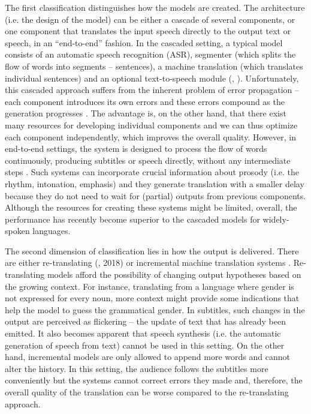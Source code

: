 \documentclass[output=paper]{langscibook}
\begin{document}
The first classification distinguishes how the models are created. The architecture (i.e. the design of the model) can be either a cascade of several components, or one component that translates the input speech directly to the output text or speech, in an “end-to-end” fashion. In the cascaded setting, a typical model consists of an automatic speech recognition (ASR), segmenter (which splits the flow of words into segments – sentences), a machine translation (which translates individual sentences) and an optional text-to-speech module (\citealt{MüllerEtAl2016}, \citealt{bojar_elitr_2021}). Unfortunately, this cascaded approach suffers from the inherent problem of error propagation – each component introduces its own errors and these errors compound as the generation progresses \citep{RuizEtAl2014}. The advantage is, on the other hand, that there exist many resources for developing individual components and we can thus optimize each component independently, which improves the overall quality. However, in end-to-end settings, the system is designed to process the flow of words continuously, producing subtitles or speech directly, without any intermediate steps \citep{PolákEtAl2022}. Such systems can incorporate crucial information about prosody (i.e. the rhythm, intonation, emphasis) and they generate translation with a smaller delay because they do not need to wait for (partial) outputs from previous components. Although the resources for creating these systems might be limited, overall, the performance has recently become superior to the cascaded models for widely-spoken languages.

The second dimension of classification lies in how the output is delivered. There are either re-translating (\citealt{NiehuesEtAl2016}, 2018) or incremental machine translation systems \citep{DalviEtAl2018}. Re-translating models afford the possibility of changing output hypotheses based on the growing context. For instance, translating from a language where gender is not expressed for every noun, more context might provide some indications that help the model to guess the grammatical gender. In subtitles, such changes in the output are perceived as flickering – the update of text that has already been emitted. It also becomes apparent that speech synthesis (i.e. the automatic generation of speech from text) cannot be used in this setting. On the other hand, incremental models are only allowed to append more words and cannot alter the history. In this setting, the audience follows the subtitles more conveniently but the systems cannot correct errors they made and, therefore, the overall quality of the translation can be worse compared to the re-translating approach.
\end{document}

